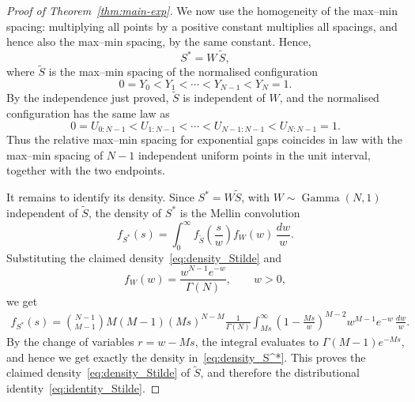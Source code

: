 \documentclass[a4paper,reqno,11pt]{amsart}
\numberwithin{equation}{section}
\numberwithin{thm}{section}
\theoremstyle{plain}
\theoremstyle{definition}
\begin{document}
{\begin{proof}[Proof of Theorem~\ref{thm:main-exp}]
We now use the homogeneity of the max--min spacing: multiplying all
points by a positive constant multiplies all spacings, and hence also the
max--min spacing, by the same constant. Hence,
\begin{equation}
    S^*
    =
    W\,\widetilde S,
\end{equation}
where $\widetilde S$ is the max--min spacing of the normalised configuration
\begin{equation}
    0=Y_0<Y_1<\cdots<Y_{N-1}<Y_N=1.
\end{equation}
By the independence just proved, $\widetilde S$ is independent of $W$, and
the normalised configuration has the same law as
\begin{equation}
    0=U_{0:N-1}<U_{1:N-1}<\cdots<U_{N-1:N-1}<U_{N:N-1}=1.
\end{equation}
Thus the relative max--min spacing for exponential gaps coincides in law with
the max--min spacing of $N-1$ independent uniform points in the unit
interval, together with the two endpoints.

It remains to identify its density. Since $S^*=W\widetilde S$, with
$W\sim\operatorname{Gamma}(N,1)$ independent of $\widetilde S$, the density
of $S^*$ is the Mellin convolution
\begin{equation}
    f_{S^*}(s)
    =
    \int_0^\infty
    f_{\widetilde S}\!\left(\frac{s}{w}\right)
    f_W(w)\,\frac{dw}{w}.
\end{equation}
Substituting the claimed density~\eqref{eq:density_Stilde}
and
\begin{equation}
    f_W(w)=\frac{w^{N-1}e^{-w}}{\Gamma(N)},\qquad w>0,
\end{equation}
we get
\begin{equation}
\begin{aligned}
f_{S^*}(s)=
\binom{N-1}{M-1}M(M-1)(Ms)^{N-M}
\frac{1}{\Gamma(N)}
\int_{Ms}^{\infty}
\left(1-\frac{Ms}{w}\right)^{M-2}
w^{M-1}e^{-w}\,\frac{dw}{w}.
\end{aligned}
\end{equation}
By the change of
variables $r=w-Ms$, the integral evaluates to
$\Gamma(M-1)e^{-Ms}$, and hence we get exactly the density in~\eqref{eq:density_S^*}. This proves the claimed
density~\eqref{eq:density_Stilde} of $\widetilde S$, and therefore the distributional identity~\eqref{eq:identity_Stilde}. 


\end{proof}






}
\end{document}
